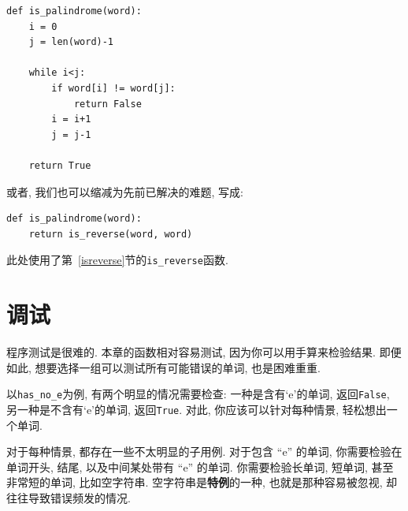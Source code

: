 \documentclass[10pt]{book}
\begin{document}
\begin{verbatim}
def is_palindrome(word):
    i = 0
    j = len(word)-1

    while i<j:
        if word[i] != word[j]:
            return False
        i = i+1
        j = j-1

    return True
\end{verbatim}

或者, 我们也可以缩减为先前已解决的难题, 写成:

\begin{verbatim}
def is_palindrome(word):
    return is_reverse(word, word)
\end{verbatim}
%
此处使用了第~\ref{isreverse}节的\verb"is_reverse"函数.

\section{调试}

程序测试是很难的. 本章的函数相对容易测试, 
因为你可以用手算来检验结果. 
即便如此, 想要选择一组可以测试所有可能错误的单词, 也是困难重重. 


以\verb"has_no_e"为例, 有两个明显的情况需要检查: 
一种是含有`e'的单词, 返回{\tt False}, 
另一种是不含有`e'的单词, 返回{\tt True}. 
对此, 你应该可以针对每种情景, 轻松想出一个单词. 

对于每种情景, 都存在一些不太明显的子用例. 
对于包含 ``e'' 的单词, 你需要检验在单词开头, 结尾, 
以及中间某处带有 ``e'' 的单词. 
你需要检验长单词, 短单词, 甚至非常短的单词, 比如空字符串. 
空字符串是{\bf 特例}的一种, 也就是那种容易被忽视, 
却往往导致错误频发的情况. 
\end{document}
